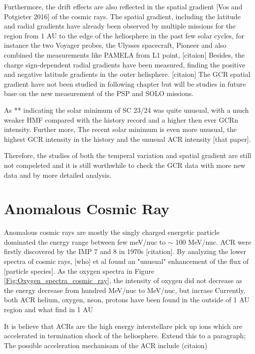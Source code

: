 Furthermore, the drift effects are also reflected in the spatial gradient [Vos and Potgieter 2016] of the cosmic rays. 
The spatial gradient, including the latitude and radial gradients have already been observed by multiple missions for the region from 1 AU to the edge of the heliosphere in the past few solar cycles, for instance the two Voyager probes, the Ulysses spacecraft, Pioneer and also combined the measurements like PAMELA from L1 point, [citaion]
Besides, the charge sign-dependent radial gradients have been measured, finding the positive and negative latitude gradients in the outer helisphere. [citaion]
The GCR spatial gradient have not been studied in following chapter but will be studies in future base on the new measurement of the PSP and SOLO missions.

As ** indicating the solar minimum of SC 23/24 was quite unusual, with a much weaker \ac{HMF} compared with the history record and a higher then ever GCRn intensity. Further more, The recent solar minimum 
is even more unusual, the highest GCR intensity in the history and the unusual ACR intensity [that paper]. 




Therefore, the studies of both the temperal variation and spatial gradient are still not compeleted and it is still worthwhile to check the GCR data with more new data and by more detailed analysis.

	


\section{Anomalous Cosmic Ray}

Anomalous cosmic rays are mostly the singly charged energetic particle dominated the energy range between few meV/nuc to $\sim$ 100 MeV/nuc. \acs{ACR} were firstly discovered by the \acs{IMP} 7 and 8 in 1970s [citation]. By analyzing the lower spectra of cosmic rays, [who] et al found an "unusual" enhancement of the flux of [particle species]. As the oxygen spectra in Figure \ref{Fig:Oxygen_spectra_cosmic_ray}, the intensity of oxygen did not decrease as the energy decrease from hundred MeV/nuc to MeV/nuc, but incrase
Currently, both ACR helium, oxygen, neon, protons have been found in the outside of 1 AU region and what find in 1 AU

It is believe that ACRs are the high energy interstellare pick up ions which are accelerated in termination shock of the heliosphere. Extend this to a paragraph;
The possible acceleration mechanisam of the ACR include  (citaion)

